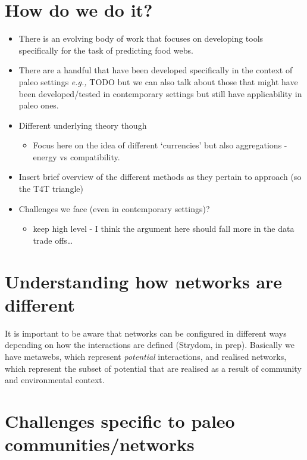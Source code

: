 \documentclass[
]{article}
\providecommand{\tightlist}{%
  \setlength{\itemsep}{0pt}\setlength{\parskip}{0pt}}
\begin{document}
\section{How do we do it?}\label{how-do-we-do-it}

\begin{itemize}
\item
  There is an evolving body of work that focuses on developing tools
  specifically for the task of predicting food webs.
\item
  There are a handful that have been developed specifically in the
  context of paleo settings \emph{e.g.,} TODO but we can also talk about
  those that might have been developed/tested in contemporary settings
  but still have applicability in paleo ones.
\item
  Different underlying theory though

  \begin{itemize}
  \tightlist
  \item
    Focus here on the idea of different `currencies' but also
    aggregations - energy vs compatibility.
  \end{itemize}
\item
  Insert brief overview of the different methods as they pertain to
  approach (so the T4T triangle)
\item
  Challenges we face (even in contemporary settings)?

  \begin{itemize}
  \tightlist
  \item
    keep high level - I think the argument here should fall more in the
    data trade offs\ldots{}
  \end{itemize}
\end{itemize}

\section{Understanding how networks are
different}\label{understanding-how-networks-are-different}

It is important to be aware that networks can be configured in different
ways depending on how the interactions are defined (Strydom, in prep).
Basically we have metawebs, which represent \emph{potential}
interactions, and realised networks, which represent the subset of
potential that are realised as a result of community and environmental
context.

\section{Challenges specific to paleo
communities/networks}\label{challenges-specific-to-paleo-communitiesnetworks}
\end{document}
